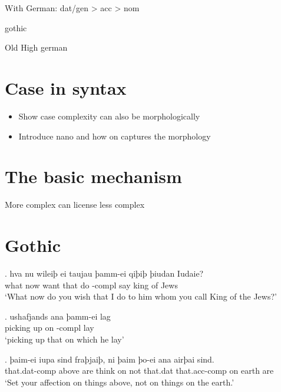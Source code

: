 With German: dat/gen > acc > nom

gothic

Old High german





\section{Case in syntax}

\begin{itemize}
	\item Show case complexity can also be morphologically
	\item Introduce nano and how on captures the morphology
\end{itemize}



\section{The basic mechanism}

More complex can license less complex


\section{Gothic \citep[339,434]{harbert1978}}

\exg. hva nu wileiþ ei taujau þamm-ei qiþiþ þiudan Iudaie?\\
what now want that do -compl say king {of Jews}\\
`What now do you wish that I do to him whom you call King of the Jews?'

\exg. ushafjands ana þamm-ei lag\\
{picking up} on -compl lay\\
`picking up that on which he lay'



\exg. þaim-ei iupa sind fraþjaiþ, ni þaim þo-ei ana airþai sind.\\
that.dat-comp above are {think on} not that.dat that.acc-comp on earth are\\
`Set your affection on things above, not on things on the earth.'



